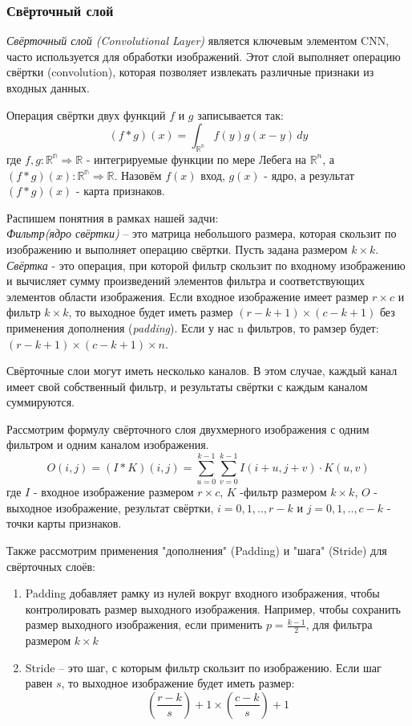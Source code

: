\subsubsection{Свёрточный слой}
\par \textit{Свёрточный слой (Convolutional Layer)} является ключевым элементом CNN, часто используется для обработки изображений. Этот слой выполняет операцию свёртки (convolution), которая позволяет извлекать различные признаки из входных данных.
\par Операция свёртки двух функций $f$ и $g$ записывается так:
\begin{equation}
	(f*g)(x) = \int_{\mathbb{R^n}}^{} f(y)g(x-y)\,dy
\end{equation}
где $f,g: \mathbb{R^n} \Rightarrow \mathbb{R}$ - интегрируемые функции по мере Лебега на $\mathbb{R}^n$, а $(f*g)(x): \mathbb{R^n} \Rightarrow \mathbb{R}$.
Назовём $f(x)$ вход, $g(x)$ - ядро, а результат $(f*g)(x)$ - карта признаков.
\par Распишем понятния в рамках нашей задчи:\\
\textit{Фильтр(ядро свёртки)} – это матрица небольшого размера, которая скользит по изображению и выполняет операцию свёртки. Пусть задана размером $k \times k$.
\textit{Свёртка} - это операция, при которой фильтр скользит по входному изображению и вычисляет сумму произведений элементов фильтра и соответствующих элементов области изображения. Если входное изображение имеет размер $r \times c$ и фильтр $k \times k$, то выходное будет иметь размер $(r-k+1) \times (c-k+1)$ без применения дополнения (\textit{padding}). Если у нас n фильтров, то рамзер будет: $(r-k+1) \times (c-k+1) \times n$.
\par Свёрточные слои могут иметь несколько каналов. В этом случае, каждый канал имеет свой собственный фильтр, и результаты свёртки с каждым каналом суммируются.
\par Рассмотрим формулу свёрточного слоя двухмерного изображения с одним фильтром и одним каналом изображения.
\begin{equation}
	O(i,j) = (I*K)(i,j) = \sum_{u=0}^{k-1}\sum_{v=0}^{k-1}I(i+u, j+v) \cdot K(u,v)
\end{equation}
где $I$ - входное изображение размером $r \times c$, $K$ -фильтр размером $k \times k$, $O$ - выходное изображение, результат свёртки, $i=0,1,.., r-k$ и $j=0,1,.., c-k$ - точки карты признаков.
\par Также рассмотрим применения "дополнения" (Padding) и "шага" (Stride) для свёрточных слоёв:
\begin{enumerate}[]
	\item Padding добавляет рамку из нулей вокруг входного изображения, чтобы контролировать размер выходного изображения. Например, чтобы сохранить размер выходного изображения, если применить $p = \frac{k-1}{2}$, для фильтра размером $k \times k$
	\item Stride – это шаг, с которым фильтр скользит по изображению. Если шаг равен 
	$s$, то выходное изображение будет иметь размер:
	\begin{equation}
		(\frac{r-k}{s}) + 1 \times (\frac{c-k}{s}) + 1 
	\end{equation}
\end{enumerate}

